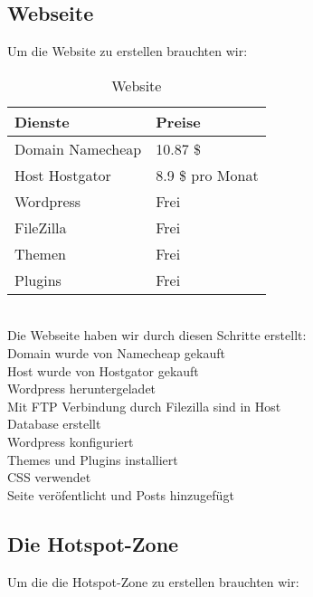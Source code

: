 \subsection{Webseite}
Um die Website zu erstellen brauchten wir:
\begin{table}[ht]
\caption{Website}
\hspace*{-2cm}
\begin{tabular}{l l}
\hline\hline
Dienste & Preise \\ [0.5ex]
\hline
Domain Namecheap & 10.87 \$ \\
\hline
Host Hostgator & 8.9 \$ pro Monat \\
\hline
Wordpress & Frei \\
\hline
FileZilla & Frei \\
\hline
Themen & Frei \\
\hline
Plugins & Frei \\
\hline
\end{tabular}
\label{table:website} 
\end{table}
\\
Die Webseite haben wir durch diesen Schritte erstellt: \\
Domain wurde von Namecheap gekauft   \\
Host wurde von Hostgator gekauft \\
Wordpress heruntergeladet \\
Mit FTP Verbindung durch Filezilla sind  in Host \\
Database erstellt \\
Wordpress konfiguriert \\
Themes und Plugins installiert \\
CSS verwendet \\
Seite ver\"ofentlicht und Posts hinzugef\"ugt \\

\subsection{Die Hotspot-Zone}
Um die die Hotspot-Zone zu erstellen brauchten wir:

